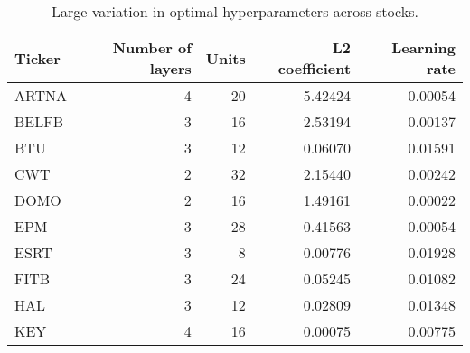 \begin{table}[H]
\centering
\caption{Large variation in optimal hyperparameters across stocks.}
\label{tab:optimal_hyper_significant}
\begin{tabular}{lrrrr}
\toprule
Ticker & Number of layers & Units & L2 coefficient & Learning rate \\
\midrule
ARTNA & 4 & 20 & 5.42424 & 0.00054 \\
BELFB & 3 & 16 & 2.53194 & 0.00137 \\
BTU & 3 & 12 & 0.06070 & 0.01591 \\
CWT & 2 & 32 & 2.15440 & 0.00242 \\
DOMO & 2 & 16 & 1.49161 & 0.00022 \\
EPM & 3 & 28 & 0.41563 & 0.00054 \\
ESRT & 3 & 8 & 0.00776 & 0.01928 \\
FITB & 3 & 24 & 0.05245 & 0.01082 \\
HAL & 3 & 12 & 0.02809 & 0.01348 \\
KEY & 4 & 16 & 0.00075 & 0.00775 \\
\bottomrule
\end{tabular}
\end{table}
